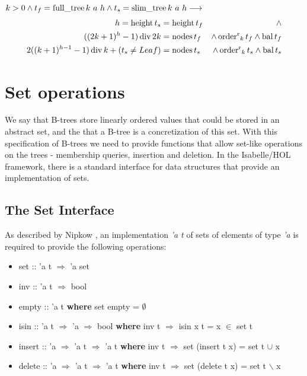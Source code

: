 \begin{theorem}
    $k > 0 \wedge t_f = \operatorname{full\_tree} k\ a\ h \wedge t_s = \operatorname{slim\_tree} k\ a\ h \longrightarrow$
    \begin{align*}
    h = \operatorname{height} t_s &= \operatorname{height} t_f &\wedge \\
        ((2k+1)^h - 1) \operatorname{div} 2k &= \operatorname{nodes} t_f &\wedge \operatorname{order^r}_k t_f \wedge \operatorname{bal} t_f \\ 
        2((k+1)^{h-1} - 1) \operatorname{div} k + (t_s \neq Leaf) &= \operatorname{nodes} t_s &\wedge \operatorname{order^r}_k t_s \wedge \operatorname{bal} t_s
    \end{align*}
\end{theorem}


\section{Set operations}

We say that B-trees store linearly ordered values
that could be stored in an abstract set,
and the that a B-tree is a concretization
of this set.
With this specification of B-trees we need to provide functions that allow
set-like operations on the trees -
membership queries, insertion and deletion.
In the Isabelle/HOL framework, there is a standard interface
for data structures that provide an implementation of sets.

\subsection{The Set Interface}

As described by Nipkow \parencite{DBLP:conf/itp/Nipkow16},
an implementation \textit{'a t} of sets of elements of type \textit{'a} is required to provide the following
operations:

\begin{itemize}
    \itshape
    \item set :: 'a t $\Rightarrow$ 'a set
    \item inv :: 'a t $\Rightarrow$ bool
    \item empty :: 'a t \textup{\textbf{where}} set empty = $\emptyset$
    \item isin :: 'a t $\Rightarrow$ 'a $\Rightarrow$ bool \textup{\textbf{where}} inv t $\Longrightarrow$ isin x t = x $\in$ set t
    \item insert :: 'a $\Rightarrow$ 'a t $\Rightarrow$ 'a t \textup{\textbf{where}} inv t $\Longrightarrow$ set (insert t x) = set t $\cup$ {x}
    \item delete :: 'a $\Rightarrow$ 'a t $\Rightarrow$ 'a t \textup{\textbf{where}} inv t $\Longrightarrow$ set (delete t x) = set t $\backslash$ {x}
\end{itemize}

